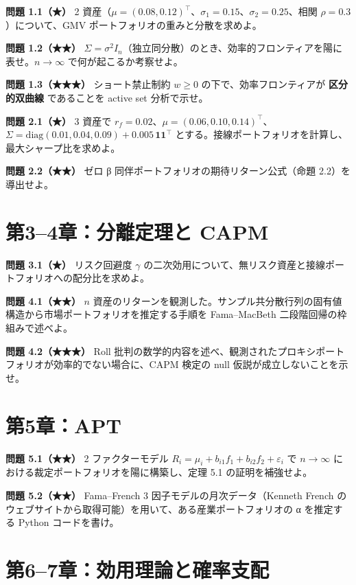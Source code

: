 \documentclass[11pt,a4paper]{report}
\begin{document}
\textbf{問題 1.1（★）} 2 資産（$\mu = (0.08, 0.12)^\top$、$\sigma_1 = 0.15$、$\sigma_2 = 0.25$、相関 $\rho = 0.3$）について、GMV ポートフォリオの重みと分散を求めよ。

\textbf{問題 1.2（★★）} $\Sigma = \sigma^2 I_n$（独立同分散）のとき、効率的フロンティアを陽に表せ。$n \to \infty$ で何が起こるか考察せよ。

\textbf{問題 1.3（★★★）} ショート禁止制約 $w \ge 0$ の下で、効率フロンティアが \textbf{区分的双曲線} であることを active set 分析で示せ。

\textbf{問題 2.1（★）} 3 資産で $r_f = 0.02$、$\mu = (0.06, 0.10, 0.14)^\top$、$\Sigma = \mathrm{diag}(0.01, 0.04, 0.09) + 0.005\, \mathbf{1}\mathbf{1}^\top$ とする。接線ポートフォリオを計算し、最大シャープ比を求めよ。

\textbf{問題 2.2（★★）} ゼロ β 同伴ポートフォリオの期待リターン公式（命題 2.2）を導出せよ。

\section{第3–4章：分離定理と CAPM}

\textbf{問題 3.1（★）} リスク回避度 $\gamma$ の二次効用について、無リスク資産と接線ポートフォリオへの配分比を求めよ。

\textbf{問題 4.1（★★）} $n$ 資産のリターンを観測した。サンプル共分散行列の固有値構造から市場ポートフォリオを推定する手順を Fama–MacBeth 二段階回帰の枠組みで述べよ。

\textbf{問題 4.2（★★★）} Roll 批判の数学的内容を述べ、観測されたプロキシポートフォリオが効率的でない場合に、CAPM 検定の null 仮説が成立しないことを示せ。

\section{第5章：APT}

\textbf{問題 5.1（★★）} 2 ファクターモデル $R_i = \mu_i + b_{i1} f_1 + b_{i2} f_2 + \varepsilon_i$ で $n \to \infty$ における裁定ポートフォリオを陽に構築し、定理 5.1 の証明を補強せよ。

\textbf{問題 5.2（★★）} Fama–French 3 因子モデルの月次データ（Kenneth French のウェブサイトから取得可能）を用いて、ある産業ポートフォリオの α を推定する Python コードを書け。

\section{第6–7章：効用理論と確率支配}
\end{document}
